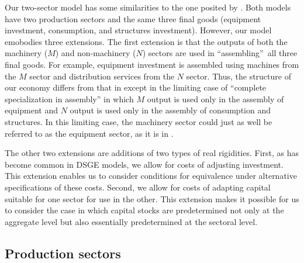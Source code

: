\documentclass[12pt,fleqn]{article}
\begin{document}
Our two-sector model has some similarities to the one posited
by . Both models have two production
sectors and the same three final goods (equipment investment, consumption,
and structures investment). However, our model emobodies three extensions. The first
extension is that the outputs of both the machinery ($M$) and non-machinery ($N$) sectors are used in
\textquotedblleft assembling\textquotedblright\ all three final goods.  For example, equipment investment is
assembled using machines from the $M$ sector and distribution services from
the $N$ sector. Thus, the structure of our economy differs from that in 
except in the limiting case of ``complete specialization in assembly'' in
which $M$ output is used only in the assembly of equipment and $N$ output is
used only in the assembly of consumption and structures. In this limiting
case, the machinery sector could just as well be referred to as the
equipment sector, as it is in .

The other two extensions are additions of two types of real
rigidities. First, as has become common in DSGE models, we allow for costs of adjusting investment.%
 This extension enables us to consider conditions for
equivalence under alternative specifications of these costs.
Second, we allow for costs of adapting capital suitable for one
sector for use in the other. This extension makes it possible for
us to consider the case in which capital stocks are predetermined
not only at the aggregate level but also essentially predetermined at the sectoral level.

\subsection{\protect\normalsize Production sectors}
\end{document}
